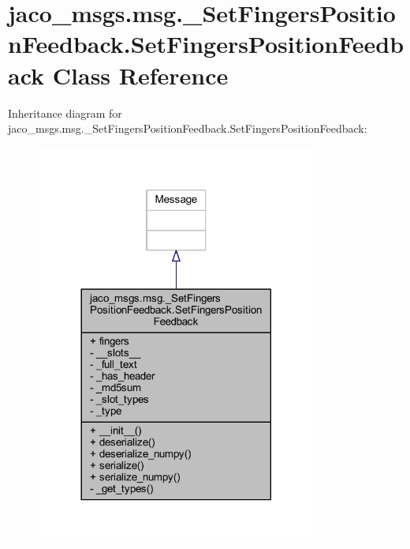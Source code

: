 \hypertarget{classjaco__msgs_1_1msg_1_1__SetFingersPositionFeedback_1_1SetFingersPositionFeedback}{}\section{jaco\+\_\+msgs.\+msg.\+\_\+\+Set\+Fingers\+Position\+Feedback.\+Set\+Fingers\+Position\+Feedback Class Reference}
\label{classjaco__msgs_1_1msg_1_1__SetFingersPositionFeedback_1_1SetFingersPositionFeedback}


Inheritance diagram for jaco\+\_\+msgs.\+msg.\+\_\+\+Set\+Fingers\+Position\+Feedback.\+Set\+Fingers\+Position\+Feedback\+:
\nopagebreak
\begin{figure}[H]
\begin{center}
\leavevmode
\includegraphics[width=260pt]{de/dbf/classjaco__msgs_1_1msg_1_1__SetFingersPositionFeedback_1_1SetFingersPositionFeedback__inherit__graph}
\end{center}
\end{figure}


